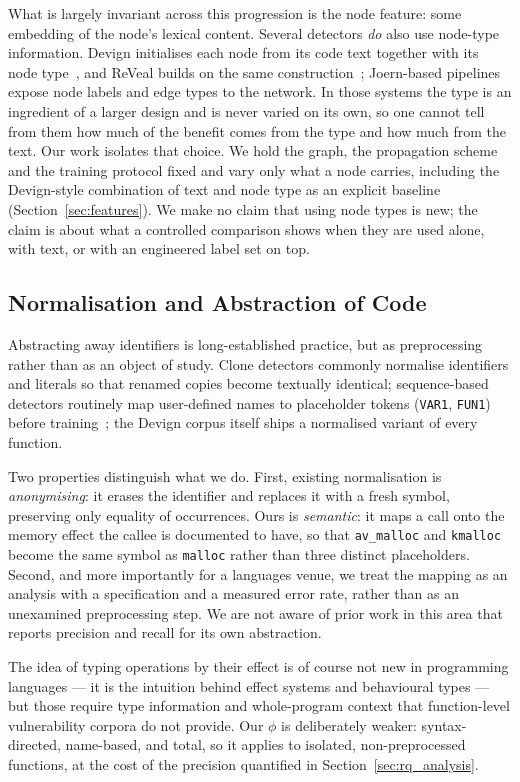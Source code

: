 \documentclass[pdflatex,sn-basic]{sn-jnl}
\theoremstyle{thmstyleone}%
\begin{document}
What is largely invariant across this progression is the node feature: some
embedding of the node's lexical content. Several detectors \emph{do} also use
node-type information. Devign initialises each node from its code text together
with its node type~\citep{zhou2019devign}, and ReVeal builds on the same
construction~\citep{chakraborty2022deep}; Joern-based pipelines expose node
labels and edge types to the network. In those systems the type is an
ingredient of a larger design and is never varied on its own, so one cannot
tell from them how much of the benefit comes from the type and how much from
the text. Our work isolates that choice. We hold the graph, the propagation
scheme and the training protocol fixed and vary only what a node carries,
including the Devign-style combination of text and node type as an explicit
baseline (Section~\ref{sec:features}). We make no claim that using node types
is new; the claim is about what a controlled comparison shows when they are
used alone, with text, or with an engineered label set on top.

\subsection{Normalisation and Abstraction of Code}
Abstracting away identifiers is long-established practice, but as
preprocessing rather than as an object of study. Clone detectors commonly normalise
identifiers and literals so that renamed copies become textually identical;
sequence-based detectors routinely map
user-defined names to placeholder tokens (\texttt{VAR1}, \texttt{FUN1}) before
training~\citep{li2018vuldeepecker, li2022sysevr}; the Devign corpus itself
ships a normalised variant of every function.

Two properties distinguish what we do. First, existing normalisation is
\emph{anonymising}: it erases the identifier and replaces it with a fresh
symbol, preserving only equality of occurrences. Ours is \emph{semantic}: it
maps a call onto the memory effect the callee is documented to have, so that
\texttt{av\_malloc} and \texttt{kmalloc} become the same symbol as
\texttt{malloc} rather than three distinct placeholders. Second, and more
importantly for a languages venue, we treat the mapping as an analysis with a
specification and a measured error rate, rather than as an unexamined
preprocessing step. We are not aware of prior work in this area that reports
precision and recall for its own abstraction.

The idea of typing operations by their effect is of course not new in
programming languages --- it is the intuition behind effect systems and behavioural
types --- but those require type information and whole-program context that
function-level vulnerability corpora do not provide. Our $\phi$ is deliberately
weaker: syntax-directed, name-based, and total, so it applies to isolated,
non-preprocessed functions, at the cost of the precision quantified in
Section~\ref{sec:rq_analysis}.
\end{document}
